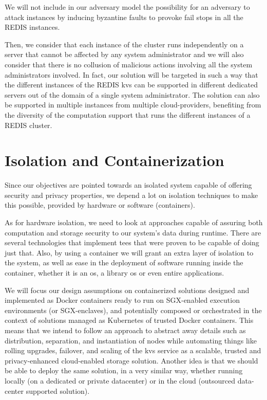 We will not include in our adversary model the possibility for an adversary to attack instances by inducing byzantine faults to provoke fail stops in all the REDIS instances. 

Then, we consider that each instance of the cluster runs independently on a server that cannot be affected by any system administrator and we will also consider that there is no collusion of malicious actions involving all the system administrators involved. In fact, our solution will be targeted in such a way that the different instances of the REDIS \gls{kvs} can be supported in different dedicated servers out of the domain of a single system administrator. The solution can also be supported in multiple instances from multiple cloud-providers, benefiting from the diversity of the computation support that runs the different instances of a REDIS cluster.



\section{Isolation and Containerization} %
\label{sec:importing_images}

Since our objectives are pointed towards an isolated system capable of offering security and privacy properties, we depend a lot on isolation techniques to make this possible, provided by hardware or software (containers). 

As for hardware isolation, we need to look at approaches capable of assuring both computation and storage security to our system's data during runtime. There are several technologies that implement \gls{tee}s that were proven to be capable of doing just that.
Also, by using a container we will grant an extra layer of isolation to the system, as well as ease in the deployment of software running inside the container, whether it is an \gls{os}, a library \gls{os} or even entire applications.

We will focus our design assumptions on containerized solutions designed and implemented as Docker containers ready to run on SGX-enabled execution environments (or SGX-enclaves), and potentially composed or orchestrated in the context of solutions managed as Kubernetes of trusted Docker containers. This means that we intend to follow an approach to abstract away details such as distribution, separation, and instantiation of nodes while automating things like rolling upgrades, failover, and scaling of the \gls{kvs} service as a scalable, trusted and privacy-enhanced cloud-enabled storage solution. Another idea is that we should be able to deploy the same solution, in a very similar way, whether running locally (on a dedicated or private datacenter) or in the cloud (outsourced data-center supported solution).


